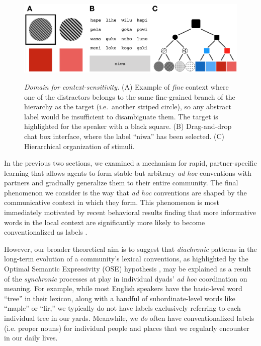 
\begin{figure}[t]
\begin{center}
{\includegraphics[scale=.63]{./figures/Sec2-design.png}}
{\caption{{\emph{Domain for context-sensitivity.} (A) Example of \emph{fine} context where one of the distractors belongs to the same fine-grained branch of the hierarchy as the target (i.e.\ another striped circle), so any abstract label would be insufficient to disambiguate them. The target is highlighted for the speaker with a black square. (B) Drag-and-drop chat box interface, where the label ``niwa'' has been selected. (C) Hierarchical organization of stimuli.\label{fig:context_design}}}}
\vspace{-2ex}
\end{center}
\end{figure}

In the previous two sections, we examined a mechanism for rapid, partner-specific learning that allows agents to form stable but arbitrary \emph{ad hoc} conventions with partners and gradually generalize them to their entire community. 
The final phenomenon we consider is the way that \emph{ad hoc} conventions are shaped by the communicative context in which they form.
This phenomenon is most immediately motivated by recent behavioral results finding that more informative words in the local context are significantly more likely to become conventionalized as labels \cite{hawkins2020characterizing}.

However, our broader theoretical aim is to suggest that \emph{diachronic} patterns in the long-term evolution of a community's lexical conventions, as highlighted by the Optimal Semantic Expressivity (OSE) hypothesis \cite{frankblogpost}, may be explained as a result of the \emph{synchronic} processes at play in individual dyads' \emph{ad hoc} coordination on meaning.
For example, while most English speakers have the basic-level word ``tree'' in their lexicon, along with a handful of subordinate-level words like ``maple'' or ``fir,'' we typically do not have labels exclusively referring to each individual tree in our yards.
Meanwhile, we \emph{do} often have conventionalized labels (i.e. proper nouns) for individual people and places that we regularly encounter in our daily lives.

